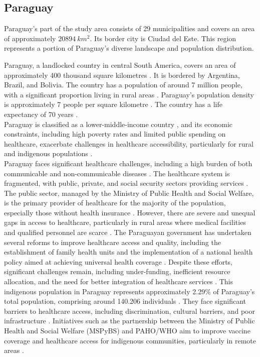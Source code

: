 \documentclass[11pt, a4paper]{report}
\begin{document}
\subsection{Paraguay}

Paraguay's part of the study area consists of  29 municipalities and covers an area of approximately $20894 \ km^2$. Its border city is Ciudad del Este. This region represents a portion of Paraguay's diverse landscape and population distribution.

Paraguay, a landlocked country in central South America, covers an area of approximately 400 thousand square kilometres \citet{runfola_geoboundaries_2020}. It is bordered by Argentina, Brazil, and Bolivia. The country has a population of around 7 million people, with a significant proportion living in rural areas \citet{united_nations_world_2022}. Paraguay's population density is approximately 7 people per square kilometre \citet{united_nations_world_2022}. The country has a life expectancy of 70 years \citet{world_bank_life_2022}. \\
%
Paraguay is classified as a lower-middle-income country \citet{world_bank_world_2022}, and its economic constraints, including high poverty rates and limited public spending on healthcare, exacerbate challenges in healthcare accessibility, particularly for rural and indigenous populations \citet{world_health_organization_access_2024}. \\
%
Paraguay faces significant healthcare challenges, including a high burden of both communicable and non-communicable diseases \citet{amnesty_international_usa_paraguay_2024}. The healthcare system is fragmented, with public, private, and social security sectors providing services \citet{oecd_-depth_2018}. The public sector, managed by the Ministry of Public Health and Social Welfare, is the primary provider of healthcare for the majority of the population, especially those without health insurance \citet{oecd_-depth_2018}. However, there are severe and unequal gaps in access to healthcare, particularly in rural areas where medical facilities and qualified personnel are scarce \citet{capurro_socioeconomic_2022}. The Paraguayan government has undertaken several reforms to improve healthcare access and quality, including the establishment of family health units and the implementation of a national health policy aimed at achieving universal health coverage \citet{oecd_reforming_2019}. Despite these efforts, significant challenges remain, including under-funding, inefficient resource allocation, and the need for better integration of healthcare services \citet{oecd_reforming_2019}. 
%
This indigenous population in Paraguay represents approximately 2.29\% of Paraguay's total population, comprising around 140.206 individuals \citet{berger_indigenous_2024}. They face significant barriers to healthcare access, including discrimination, cultural barriers, and poor infrastructure \citet{berger_indigenous_2024}. Initiatives such as the partnership between the Ministry of Public Health and Social Welfare (MSPyBS) and PAHO/WHO aim to improve vaccine coverage and healthcare access for indigenous communities, particularly in remote areas \citet{world_health_organization_access_2024}.
\end{document}
